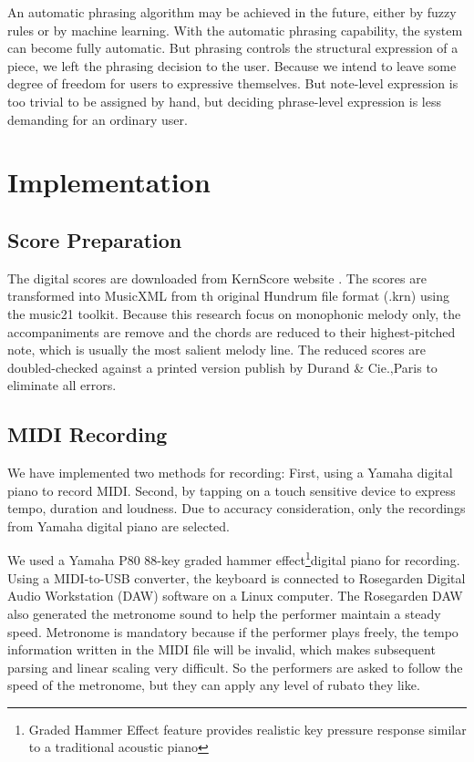    An automatic phrasing algorithm may be achieved in the future, either by fuzzy rules or by machine learning. With the automatic phrasing capability, the system can become fully automatic. But phrasing controls the structural expression of a piece, we left the phrasing decision to the user. Because we intend to leave some degree of freedom for users to expressive themselves. But note-level expression is too trivial to be assigned by hand, but deciding phrase-level expression is less demanding for an ordinary user. 

 
\section{Implementation}

\subsection{Score Preparation}

The digital scores are downloaded from KernScore website \cite{KernScores}. The  scores are transformed into MusicXML from th original Hundrum file format (.krn) using the  music21 toolkit. Because this research focus on monophonic melody only, the accompaniments are remove and the chords are reduced to their highest-pitched note, which is usually the most salient melody line. The reduced scores are doubled-checked against a printed version publish by Durand \& Cie.,Paris \cite{Clementi1915} to eliminate all errors. %

\subsection{MIDI Recording}
We have implemented two methods for recording: First, using a Yamaha digital piano to record MIDI. Second, by tapping on a touch sensitive device to express tempo, duration and loudness. Due to accuracy consideration, only the recordings from Yamaha digital piano are selected.


We used a Yamaha P80 88-key graded hammer effect\footnote{Graded Hammer Effect feature provides realistic key pressure response similar to a traditional acoustic piano}digital piano for recording. Using a MIDI-to-USB converter, the keyboard is connected to Rosegarden Digital Audio Workstation (DAW) software on a Linux computer. The Rosegarden DAW also generated the metronome sound to help the performer maintain a steady speed. Metronome is mandatory because if the performer plays freely, the tempo information written in the MIDI file will be invalid, which makes subsequent parsing and linear scaling very difficult. So the performers are asked to follow the speed of the metronome, but they can apply any level of rubato they like. 

